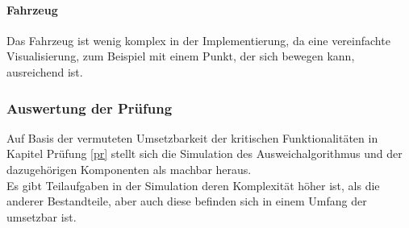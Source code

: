 \paragraph{Fahrzeug}
Das Fahrzeug ist wenig komplex in der Implementierung, da eine vereinfachte Visualisierung, zum Beispiel mit einem Punkt, der sich bewegen kann, ausreichend ist.

\subsubsection{Auswertung der Prüfung}
Auf Basis der vermuteten Umsetzbarkeit der kritischen Funktionalitäten in Kapitel Prüfung \ref{pr} stellt sich die Simulation des Ausweichalgorithmus und der dazugehörigen Komponenten als machbar heraus. \\
Es gibt Teilaufgaben in der Simulation deren Komplexität höher ist, als die anderer Bestandteile, aber auch diese befinden sich in einem Umfang der umsetzbar ist.\\


\newpage
